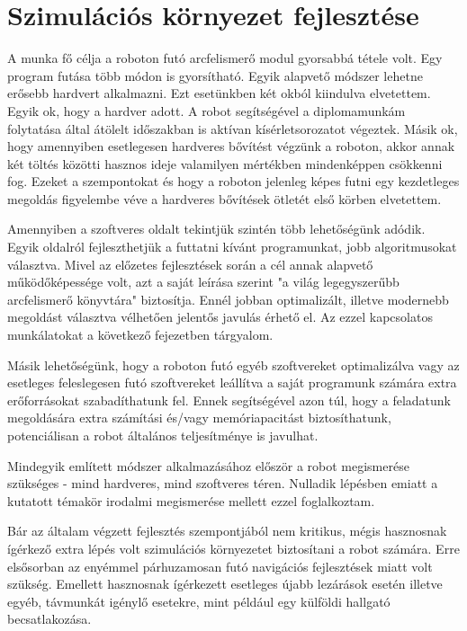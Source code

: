 \chapter{Szimulációs környezet fejlesztése}
A munka fő célja a roboton futó arcfelismerő modul gyorsabbá tétele volt. Egy program futása több módon is gyorsítható. Egyik alapvető módszer lehetne erősebb hardvert alkalmazni. Ezt esetünkben két okból kiindulva elvetettem. Egyik ok, hogy a hardver adott. A robot segítségével a diplomamunkám folytatása által átölelt időszakban is aktívan kísérletsorozatot végeztek. Másik ok, hogy amennyiben esetlegesen hardveres bővítést végzünk a roboton, akkor annak két töltés közötti hasznos ideje valamilyen mértékben mindenképpen csökkenni fog. Ezeket a szempontokat és hogy a roboton jelenleg képes futni egy kezdetleges megoldás figyelembe véve a hardveres bővítések ötletét első körben elvetettem.

Amennyiben a szoftveres oldalt tekintjük szintén több lehetőségünk adódik. Egyik oldalról fejleszthetjük a futtatni kívánt programunkat, jobb algoritmusokat választva. Mivel az előzetes fejlesztések során a cél annak alapvető működőképessége volt, azt a saját leírása szerint "a világ legegyszerűbb arcfelismerő könyvtára"\cite{geitgey_face_recognition_2021} biztosítja. Ennél jobban optimalizált, illetve modernebb megoldást választva vélhetően jelentős javulás érhető el. Az ezzel kapcsolatos munkálatokat a következő fejezetben tárgyalom.

Másik lehetőségünk, hogy a roboton futó egyéb szoftvereket optimalizálva vagy az esetleges feleslegesen futó szoftvereket leállítva a saját programunk számára extra erőforrásokat szabadíthatunk fel. Ennek segítségével azon túl, hogy a feladatunk megoldására extra számítási és/vagy memóriapacitást biztosíthatunk, potenciálisan a robot általános teljesítménye is javulhat.

Mindegyik említett módszer alkalmazásához először a robot megismerése szükséges - mind hardveres, mind szoftveres téren. Nulladik lépésben emiatt a kutatott témakör irodalmi megismerése mellett ezzel foglalkoztam.

Bár az általam végzett fejlesztés szempontjából nem kritikus, mégis hasznosnak ígérkező extra lépés volt szimulációs környezetet biztosítani a robot számára. Erre elsősorban az enyémmel párhuzamosan futó navigációs fejlesztések miatt volt szükség. Emellett hasznosnak ígérkezett esetleges újabb lezárások esetén illetve egyéb, távmunkát igénylő esetekre, mint például egy külföldi hallgató becsatlakozása.

